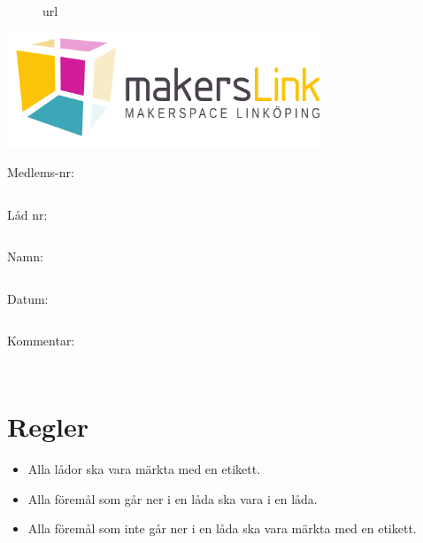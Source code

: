 \documentclass{article}
\def\tagurl{ {{ url }} }
\def\memberid{ {{ tag.member_id.id }} }
\def\tagboxnumber{ {{ tag.box_number }} }
\def\membername{ {{ tag.member_id.name }} }
\def\tagprintdate{ {{ tag.print_date }} }
\def\tagcomment{ {{ tag.comment }} }
\begin{document}
\begin{figure}
\vspace{0.5cm}
\qrcode[height=4cm]{\tagurl}
\caption{\tagurl}
\end{figure}

\includegraphics[width=0.7\textwidth]{MakersLink-line-color.png}

\vspace{1.3cm}

Medlems-nr:
\begin{tabular}{>{\centering}p{3em}}
	\memberid
	\tabularnewline
    \hline

\end{tabular}Låd nr: \begin{tabular}{>{\centering}p{3em}}
	\tagboxnumber
	\tabularnewline
    \hline

\end{tabular}

Namn:
\begin{tabular}{>{\centering}p{13em}}
	\membername
	\tabularnewline
    \hline

\end{tabular}

Datum:
\begin{tabular}{>{\centering}p{12.5em}}
	\tagprintdate
	\tabularnewline
    \hline

\end{tabular}

Kommentar:
\begin{tabular}{>{\centering}p{10.5em}}
	\tagcomment
	\tabularnewline
    \hline
\end{tabular}

\begin{tabular}{>{\centering}p{16.5em}}
	\tabularnewline
    \hline
\end{tabular}
\newpage

\section*{Regler}

\begin{itemize}
	\item Alla lådor ska vara märkta med en etikett.
    \item Alla föremål som går ner i en låda ska vara i en låda.
    \item Alla föremål som inte går ner i en låda ska vara märkta med en etikett.
\end{itemize}
\end{document}
